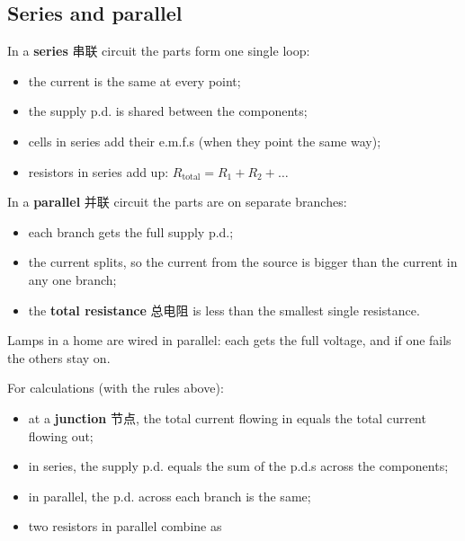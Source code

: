 \documentclass[11pt]{article}
\begin{document}
\subsection*{Series and parallel}

In a \textbf{series} 串联 circuit the parts form one single loop:

\begin{itemize}
\item the current is the same at every point;

\item the supply p.d. is shared between the components;

\item cells in series add their e.m.f.s (when they point the same way);

\item resistors in series add up: $R_{\text{total}} = R_1 + R_2 + \dots$

\end{itemize}

In a \textbf{parallel} 并联 circuit the parts are on separate branches:

\begin{itemize}
\item each branch gets the full supply p.d.;

\item the current splits, so the current from the source is bigger than the current in any one branch;

\item the \textbf{total resistance} 总电阻 is less than the smallest single resistance.

\end{itemize}

Lamps in a home are wired in parallel: each gets the full voltage, and if one fails the others stay on.

For calculations (with the rules above):

\begin{itemize}
\item at a \textbf{junction} 节点, the total current flowing in equals the total current flowing out;

\item in series, the supply p.d. equals the sum of the p.d.s across the components;

\item in parallel, the p.d. across each branch is the same;

\item two resistors in parallel combine as

\end{itemize}
\end{document}
